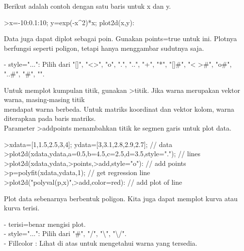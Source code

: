\documentclass[a4paper,10pt]{article}
\begin{document}
\begin{eulernotebook}
\begin{eulercomment}
\begin{eulercomment}
\begin{eulercomment}
\begin{eulercomment}
\begin{eulercomment}
\begin{eulercomment}
\begin{eulercomment}
\begin{eulercomment}
\begin{eulercomment}
\begin{eulercomment}
\begin{eulercomment}
Berikut adalah contoh dengan satu baris untuk x dan y.
\end{eulercomment}
\begin{eulerprompt}
>x=-10:0.1:10; y=exp(-x^2)*x; plot2d(x,y):
\end{eulerprompt}
\begin{eulercomment}
Data juga dapat diplot sebagai poin. Gunakan points=true untuk ini.
Plotnya berfungsi seperti poligon, tetapi hanya menggambar sudutnya
saja.

- style="...": Pilih dari "[]", "\textless{}\textgreater{}", "o", ".", "..", "+", "*", "[]#",
"\textless{} \textgreater{}#", "o#", "..#", "#", "\textbar{}".

Untuk memplot kumpulan titik, gunakan \textgreater{}titik. Jika warna merupakan
vektor warna, masing-masing titik\\
mendapat warna berbeda. Untuk matriks koordinat dan vektor kolom,
warna diterapkan pada baris matriks.\\
Parameter \textgreater{}addpoints menambahkan titik ke segmen garis untuk plot
data.
\end{eulercomment}
\begin{eulerprompt}
>xdata=[1,1.5,2.5,3,4]; ydata=[3,3.1,2.8,2.9,2.7]; // data
>plot2d(xdata,ydata,a=0.5,b=4.5,c=2.5,d=3.5,style="."); // lines
>plot2d(xdata,ydata,>points,>add,style="o"): // add points
>p=polyfit(xdata,ydata,1); // get regression line
>plot2d("polyval(p,x)",>add,color=red): // add plot of line
\end{eulerprompt}
\begin{eulercomment}
Plot data sebenarnya berbentuk poligon. Kita juga dapat memplot kurva
atau kurva terisi.

- terisi=benar mengisi plot.\\
- style="...": Pilih dari "#", "/", "\textbackslash{}", "\textbackslash{}/".\\
- Fillcolor : Lihat di atas untuk mengetahui warna yang tersedia.


\end{eulercomment}
\end{eulercomment}
\end{eulercomment}
\end{eulercomment}
\end{eulercomment}
\end{eulercomment}
\end{eulercomment}
\end{eulercomment}
\end{eulercomment}
\end{eulercomment}
\end{eulercomment}
\end{eulernotebook}
\end{document}

